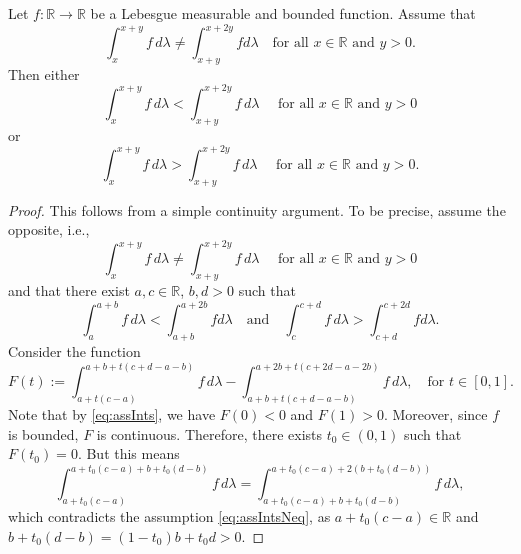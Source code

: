 \documentclass[10pt,a4paper]{amsart}
\newcommand{\R}{\mathbb{R}}
\begin{document}
\begin{lemma}\label{lem:alwaysSmallerOrLarger}
Let $f \colon \R \to \R$ be a Lebesgue measurable and bounded function. Assume that 
\[
    \int_x^{x+y} f\, d \lambda \neq \int_{x+y}^{x+2y} f d \lambda
    \quad \text{for all } x\in \R \text{ and } y>0.
\]
Then either
\[
    \int_x^{x+y} f\, d \lambda 
    < \int_{x+y}^{x+2y} f\, d \lambda 
    \quad \text{ for all } x \in \R \text{ and } y>0
\]
or 
\[
    \int_x^{x+y} f\, d \lambda 
    > \int_{x+y}^{x+2y} f\, d \lambda 
    \quad \text{ for all } x \in \R \text{ and } y>0.
\]
\end{lemma}

\begin{proof}
This follows from a simple continuity argument. 
To be precise, 
assume the opposite, i.e., %
\begin{equation}\label{eq:assIntsNeq}
    \int_x^{x+y} f\, d \lambda 
    \neq \int_{x+y}^{x+2y} f\, d \lambda 
    \quad \text{ for all } x \in \R \text{ and } y>0
\end{equation}  
and that there exist $a,c \in \R$, $b,d>0$ such that
\begin{equation}\label{eq:assInts}
    \int_a^{a+b} f\, d \lambda 
    < \int_{a+b}^{a+2b} f d \lambda 
    \quad \text{and} \quad 
    \int_c^{c+d} f\, d \lambda 
    > \int_{c+d}^{c+2d} f d \lambda.
\end{equation}
Consider the function
\[
    F(t) 
    := \int_{a+t(c-a)}^{a+b+t(c+d-a-b)} f\, d \lambda - \int_{a+b+t(c+d-a-b)}^{a+2b+t(c+2d-a-2b)} f\, d \lambda,
    \quad \text{for } t \in [0,1].
\]
Note that by \eqref{eq:assInts}, we have $F(0)<0$ and $F(1)>0$. 
Moreover, since $f$ is bounded, $F$ is continuous.
Therefore, there exists $t_0 \in (0,1)$ such that $F(t_0) = 0$. But this means
\[
    \int_{a+t_0(c-a)}^{a+t_0(c-a) + b+t_0(d-b)} f\, d \lambda 
    = \int_{a+t_0(c-a) + b+t_0(d-b)}^{a+t_0(c-a) + 2(b+t_0(d-b))} f\, d \lambda,
\]
which contradicts the assumption \eqref{eq:assIntsNeq}, as $a+t_0(c-a) \in \R$ and $b+t_0(d-b) = (1-t_0)b + t_0 d >0$.
\end{proof}
\end{document}
